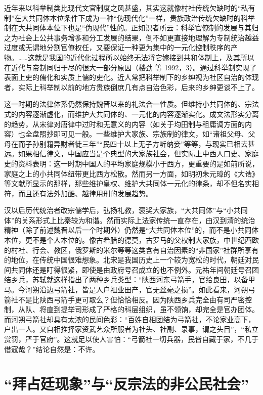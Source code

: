 \documentclass[a4paper,12pt,punct=kaiming,fontset=none]{ctexart}
\begin{document}
近年来以科举制类比现代文官制度之风甚盛，其实这就像村社传统欠缺时的“私有制”在大共同体本位条件下成为一种“伪现代化”一样，贵族政治传统欠缺时的科举制在大共同体本位下也是“伪现代”性的。正如识者所云：科举官僚制的发展与其归之为社会上公共事务增多和分工发展的结果，倒不如更直接地理解为专制统治越益过度或无谓地分割官僚权任，又要保证一种更为集中的一元化控制秩序的产物。……这就是我国的近代化过程所以始终无法将它嫁接到共和体制上，及其所以在近代与帝制同归于尽的很大一部分原因（楼劲 等 1992，3）。通过科举制实现了表面上吏的儒化和实质上儒的吏化。近人常把科举制下的乡绅视为社区自治的体现者，实际上科举制以前的地方贵族倒庶几有点自治色彩，后来的乡绅更谈不上了。

这一时期的法律体系仍然保持魏晋以来的礼法合一性质。但维持小共同体的、宗法式的内容逐渐虚化，而维护大共同体的、一元化的内容逐渐实化。成文法形实分离的趋势，从宋律对唐律中过时和无意义的内容（如关于均田制与租庸调方面的内容）也全盘照抄即可见一般。一些维护大家族、宗族制的律文，如“诸祖父母、父母在而子孙别籍异财者徒三年”“民四十以上无子方听纳妾”等等，与现实已相去甚远。如果相信律文，中国应当是个典型的大家族社会，但实际上中西人口史、家庭史的资料表明：这一时期中国人的平均家庭规模小于西方，更重要的是如前所说，家庭之上的小共同体纽带更比西方松散。然而另一方面，如明初朱元璋的《大诰》等文献所显示的那样，那些维护皇权、维护大共同体一元化的律条，却不但名实相符，而且还有法外加酷、越律用刑的发展趋势。

汉以后历代统治者改宗儒学后，弘扬礼教，褒奖大家族，“大共同体”与“小共同体”的关系形式上比秦较为和谐。然而实际上法家传统一直存在，由汉到清的统治精神（除了前述魏晋以后一个时期外）仍然是“大共同体本位”的，而不是小共同体本位，更不是个人本位的。像古希腊的德莫，古罗马的父权制大家族，中世纪西欧的村社、行会、教区，俄罗斯的米尔等等这类含有自治因素的“非国家”社群所享有的地位，在传统中国很难想象。北宋是我国历史上一个较为宽松的时代，朝廷对民间共同体还是盯得很紧，即使是由政府号召成立的也不例外。元祐年间朝廷号召团结乡兵，苏轼就这样指出了两种乡兵类型：“陕西河东弓箭手，官给良田，以备甲马。今河朔沿边弓箭社，皆是人户祖业田产，官无丝毫之损”。如此看来，河朔弓箭社不是比陕西弓箭手更可取么？但恰恰相反。因为陕西乡兵完全由有司严密控制，从队、将直到提举司形成了严格的科层组织，虽不领饷，却完全是官办团体。而河朔弓箭社却具有太浓的民间色彩：“百姓自相团结为弓箭社，不论家业高下，户出一人。又自相推择家资武艺众所服者为社头、社副、录事，谓之头目”，“私立赏罚，严于官府”。这就足以使人害怕：“弓箭社一切兵器，民皆自藏于家，不几于借寇哉？”结论自然是：不许。

\section*{“拜占廷现象”与“反宗法的非公民社会”}
\end{document}
